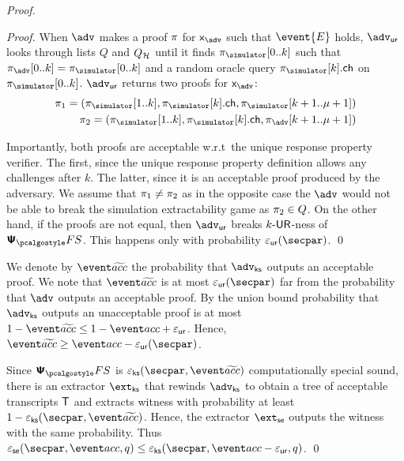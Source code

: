 \begin{proof}
\begin{proof}
	When $\advse$ makes a proof $\pi$ for $\inp_{\advse}$ such that $\event{E}$ holds, $\advur$ looks through lists $Q$ and $Q_{\mathcal{H}}$ until it finds $\zkproofs[0..k]$ such that $\zkproof_{\advse}[0..k] = \zkproofs[0..k]$ and a random oracle query $\zkproofs[k].\ch$ on $\zkproofs[0..k]$.	$\advur$ returns two proofs for $\inp_{\advse}$:
		\begin{align*}
		\zkproof_1 = (\zkproofs[1..k],
		\zkproofs[k].\ch, \zkproofs[k + 1..\mu + 1])\\
		\zkproof_2 = (\zkproofs[1..k],
		\zkproofs[k].\ch, \zkproof_{\advse}[k + 1..\mu + 1])
		\end{align*}

	Importantly, both proofs are acceptable w.r.t~the unique response property verifier. The first, since the unique response property definition allows any challenges after $k$. The latter, since it is an acceptable proof produced by the adversary.
	We assume that $\pi_1 \neq \pi_2$ as in the opposite case the $\advse$ would not be able to break the simulation extractability game as $\pi_2 \in Q$. On the other hand, if the proofs are not equal, then $\advur$ breaks ${k\text{-}\mathsf{UR}}$-ness of $\psfs$. This happens only with  probability $\epsur(\secpar)$. 
	\qed
	\end{proof}

	We denote by $\waccProb$ the probability that $\advcss$ outputs an acceptable proof. We note that $\waccProb$ is at most $\epsur (\secpar)$ far from the probability that $\advse$ outputs an acceptable proof. By the union bound probability that $\advcss$ outputs an unacceptable proof is at most $1 - \waccProb \leq 1 - \accProb + \epsur$. Hence, $\waccProb \geq \accProb - \epsur (\secpar)$. 

	Since $\psfs$ is $\epscss (\secpar, \waccProb)$ computationally special sound, there is an extractor $\extcss$ that rewinds $\advcss$ to obtain a tree of acceptable transcripts $\mathsf{T}$ and extracts witness with probability at least $1 - \epscss (\secpar, \waccProb)$. Hence, the extractor $\extse$ outputs the witness with the same probability.
%
	Thus $\epsse(\secpar,\accProb,q) \leq \epscss(\secpar,\accProb - \epsur,q)$.
	\qed
	\end{proof}


